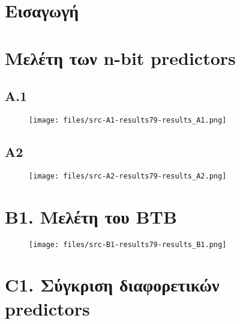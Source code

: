 \documentclass[a4paper,12pt]{article}
\begin{document}
\def\thesection {\roman{section}: }
\def\thesubsection {\Roman{subsection}) }



\section*{Εισαγωγή}

\section*{Μελέτη των n-bit predictors}

\subsection*{A.1}

\begin{figure}[H]
    \centering
    \texttt{[image: files/src-A1-results79-results\_A1.png]}
    \caption{}
\end{figure}



\pagebreak


\subsection*{A2}

\begin{figure}[H]
    \centering
    \texttt{[image: files/src-A2-results79-results\_A2.png]}
    \caption{}
\end{figure}



\section*{B1. Μελέτη του BTB}

\begin{figure}[H]
    \centering
    \texttt{[image: files/src-B1-results79-results\_B1.png]}
    \caption{}
\end{figure}



\section*{C1. Σύγκριση διαφορετικών predictors}
\end{document}
